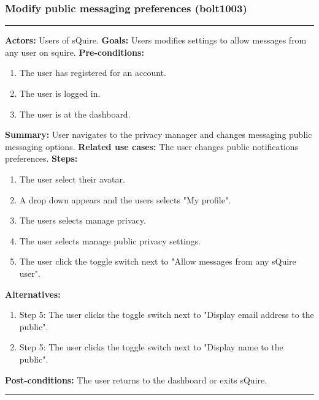 \documentclass[11pt]{report}
\begin{document}
\subsubsection{Modify public messaging preferences (bolt1003)}
\vspace{2pt}
\hrule
\vspace{8pt}
 \textbf{Actors:} Users of sQuire. \newline
\textbf{Goals:} Users modifies settings to allow messages from any user on squire. \newline
 \textbf{Pre-conditions:} \begin{enumerate}
  \item The user has registered for an account.
  \item The user is logged in.
  \item The user is at the dashboard.
 \end{enumerate}
 \textbf{Summary:} User navigates to the privacy manager and changes messaging public messaging options.\newline
\textbf{Related use cases:} The user changes public notifications preferences. \newline
\textbf{Steps:} \begin{enumerate}
  \item The user select their avatar.
  \item A drop down appears and the users selects "My profile".
  \item The users selects manage privacy.
  \item The user selects manage public privacy settings.
  \item The user click the toggle switch next to "Allow messages from any sQuire user".
 \end{enumerate}
 \textbf{Alternatives:} \begin{enumerate}
  \item Step 5: The user clicks the toggle switch next to "Display email address to the public".
  \item Step 5: The user clicks the toggle switch next to "Display name to the public".
 \end{enumerate}
 \textbf{Post-conditions:} The user returns to the dashboard or exits sQuire. \newline
\vspace{8pt}
\hrule
\newpage
\end{document}
